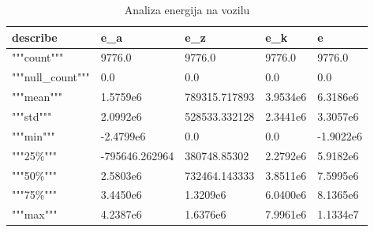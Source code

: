 \begin{table}[!ht]
    \centering
    \caption{Analiza energija na vozilu}
    \begin{tabular}{lllll}
    \hline
        \textbf{describe} & \textbf{e\_a} & \textbf{e\_z} & \textbf{e\_k} & \textbf{e} \\ \hline
        """count""" & 9776.0 & 9776.0 & 9776.0 & 9776.0 \\ 
        """null\_count""" & 0.0 & 0.0 & 0.0 & 0.0 \\ 
        """mean""" & 1.5759e6 & 789315.717893 & 3.9534e6 & 6.3186e6 \\ 
        """std""" & 2.0992e6 & 528533.332128 & 2.3441e6 & 3.3057e6 \\ 
        """min""" & -2.4799e6 & 0.0 & 0.0 & -1.9022e6 \\ 
        """25\%""" & -795646.262964 & 380748.85302 & 2.2792e6 & 5.9182e6 \\ 
        """50\%""" & 2.5803e6 & 732464.143333 & 3.8511e6 & 7.5995e6 \\ 
        """75\%""" & 3.4450e6 & 1.3209e6 & 6.0400e6 & 8.1365e6 \\ 
        """max""" & 4.2387e6 & 1.6376e6 & 7.9961e6 & 1.1334e7 \\ \hline
    \end{tabular}
    \label{table:c:energies}
\end{table}